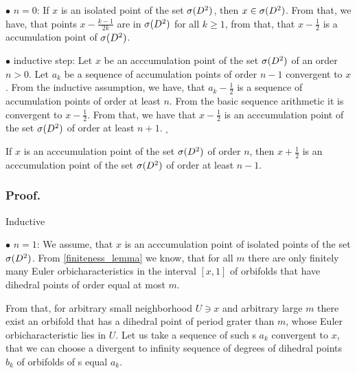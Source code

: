 $\bullet$ $n = 0$: If $x$ is an isolated point of the set ${{\sigma}(D^2)}$, then $x \in {{\sigma}(D^2)}$. 
From that, we 
have, that points $x - \frac{k-1}{2k}$ are in ${{\sigma}(D^2)}$ for all $k \geq 1$, from that, that 
$x-\frac{1}{2}$ is a 
accumulation point of ${{\sigma}(D^2)}$. 

$\bullet$ inductive step: Let $x$ be an acccumulation point of the set ${{\sigma}(D^2)}$ of an order 
$n > 0$. 
Let $a_k$ be a sequence of accumulation points of order $n-1$ convergent to $x$. From the 
inductive assumption, we have, that $a_k - \frac{1}{2}$ is a sequence of accumulation points 
of order at least $n$. From the basic sequence arithmetic it is convergent to $x-\frac{1}{2}$. 
From that, we have that $x-\frac{1}{2}$ is an acccumulation point of the set ${{\sigma}(D^2)}$ of order 
at least $n+1$. $_\square$
\begin{lemma}\label{second_order_lemma}
If $x$ is an acccumulation point of the set ${{\sigma}(D^2)}$ of order $n$, then $x+\frac{1}{2}$ is 
an acccumulation point of the set ${{\sigma}(D^2)}$ of order at least $n-1$.  
\end{lemma}
\subsubsection{Proof.}  
Inductive 

$\bullet$ $n = 1$: We assume, that $x$ is an acccumulation point of isolated points of the set 
${{\sigma}(D^2)}$. 
From \ref{finiteness_lemma} we know, that for all $m$ there are only finitely many 
Euler orbicharacteristics 
in the interval $[x,1]$ of orbifolds that have dihedral points of order equal at most $m$. 

From that, for arbitrary small neighborhood $U \ni x$ and arbitrary large $m$ there exist 
an orbifold 
that has a dihedral point of period grater than $m$, whose Euler orbicharacteristic lies in $U$. 
Let us take a sequence of such \Eoc s $a_k$ convergent to $x$, that we can choose 
a divergent to infinity sequence of degrees of dihedral points $b_k$ of orbifolds of \Eoc s 
equal $a_k$. 

